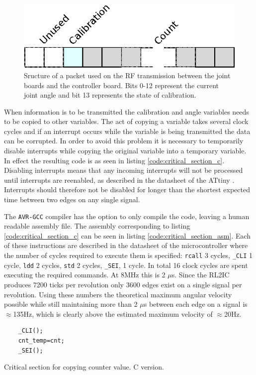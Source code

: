 \begin{figure}[h]
	\centering
	\includegraphics[width=.5\linewidth]{graphics/rf_packet}
	\caption[RF transmission packet used from the joint board.]{Sructure of a packet used on the RF transmission between the joint boards and the controller board. Bits 0-12 represent the current joint angle and bit 13 represents the state of calibration.}
	\label{fig:rfpacket}
\end{figure}

When information is to be transmitted the calibration and angle variables needs to be copied to other variables.
The act of copying a variable takes several clock cycles and if an interrupt occurs while the variable is being transmitted the data can be corrupted.
In order to avoid this problem it is necessary to temporarily disable interrupts while copying the original variable into a temporary variable. 
In effect the resulting code is as seen in listing \ref{code:critical_section_c}.
Disabling interrupts means that any incoming interrupts will not be processed until interrupts are reenabled, as described in the datasheet of the ATtiny \cite{attiny84}.
Interrupts should therefore not be disabled for longer than the shortest expected time between two edges on any single signal.

The \texttt{AVR-GCC} compiler has the option to only compile the code, leaving a human readable assembly file.
The assembly corresponding to listing \ref{code:critical_section_c} can be seen in listing \ref{code:critical_section_asm}.
Each of these instructions are described in the datasheet of the microcontroller where the number of cycles required to execute them is specified: \texttt{rcall} 3 cycles, \texttt{\_CLI} 1 cycle, \texttt{ldd} 2 cycles, \texttt{std} 2 cycles, \texttt{\_SEI}, 1 cycle.
In total 16 clock cycles are spent executing the required commands.
At 8MHz this is 2 $\mu$s.
Since the RL2IC produces 7200 ticks per revolution only 3600 edges exist on a single signal per revolution. 
Using these numbers the theoretical maximum angular velocity possible while still maintaining more than 2 $\mu$s between each edge on a signal is $\approx$135Hz, which is clearly above the estimated maximum velocity of $\approx$20Hz.

\begin{listing}[h] 
\begin{verbatim}
	_CLI();
	cnt_temp=cnt;
	_SEI();
\end{verbatim}
\caption{Critical section for copying counter value. C version.}
\label{code:critical_section_c}
\end{listing}

